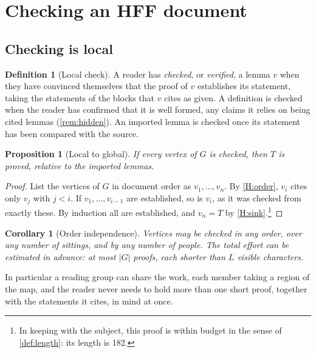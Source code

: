 \documentclass[11pt]{article}
\theoremstyle{plain}
\newtheorem{proposition}[theorem]{Proposition}
\newtheorem{corollary}[theorem]{Corollary}
\theoremstyle{definition}
\newtheorem{definition}[theorem]{Definition}
\theoremstyle{remark}
\theoremstyle{definition}
\theoremstyle{plain}
\theoremstyle{remark}
\begin{document}
\section{Checking an HFF document}\label{sec:check}

\subsection{Checking is local}

\begin{definition}[Local check]\label{def:local}
A reader has \emph{checked}, or \emph{verified}, a lemma $v$ when they have convinced themselves that the proof of $v$ establishes its statement, taking the statements of the blocks that $v$ cites as given. A definition is checked when the reader has confirmed that it is well formed, any claims it relies on being cited lemmas (\cref{rem:hidden}). An imported lemma is checked once its statement has been compared with the source.
\end{definition}

\begin{proposition}[Local to global]\label{prop:local-global}
If every vertex of $G$ is checked, then $T$ is proved, relative to the imported lemmas.
\end{proposition}

\begin{proof}
List the vertices of $G$ in document order as $v_1, \dots, v_n$. By \ref{H:order}, $v_i$ cites only $v_j$ with $j < i$. If $v_1, \dots, v_{i-1}$ are established, so is $v_i$, as it was checked from exactly these. By induction all are established, and $v_n = T$ by \ref{H:sink}.\footnote{In keeping with the subject, this proof is within budget in the sense of \cref{def:length}: its length is 182.}
\end{proof}

\begin{corollary}[Order independence]\label{cor:order}
Vertices may be checked in any order, over any number of sittings, and by any number of people. The total effort can be estimated in advance: at most $|G|$ proofs, each shorter than $L$ visible characters.
\end{corollary}

In particular a reading group can share the work, each member taking a region of the map, and the reader never needs to hold more than one short proof, together with the statements it cites, in mind at once.
\end{document}
